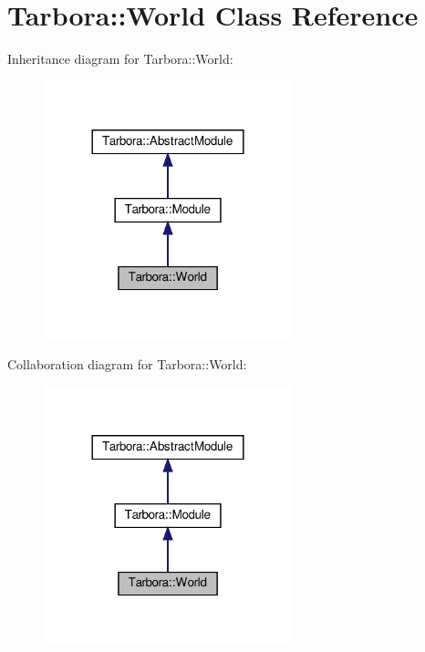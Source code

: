 \hypertarget{classTarbora_1_1World}{}\section{Tarbora\+:\+:World Class Reference}
\label{classTarbora_1_1World}


Inheritance diagram for Tarbora\+:\+:World\+:\nopagebreak
\begin{figure}[H]
\begin{center}
\leavevmode
\includegraphics[width=204pt]{classTarbora_1_1World__inherit__graph}
\end{center}
\end{figure}


Collaboration diagram for Tarbora\+:\+:World\+:\nopagebreak
\begin{figure}[H]
\begin{center}
\leavevmode
\includegraphics[width=204pt]{classTarbora_1_1World__coll__graph}
\end{center}
\end{figure}
